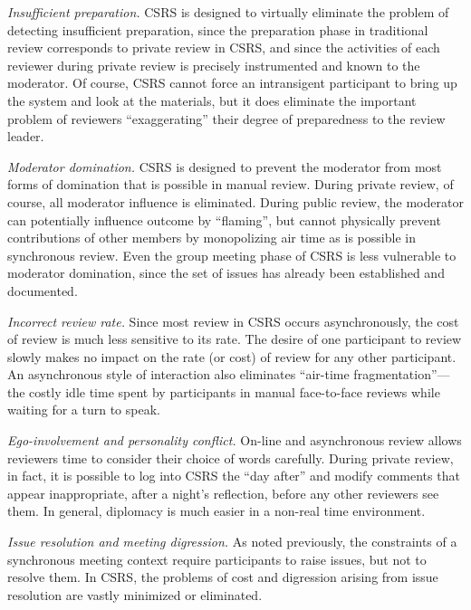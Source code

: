 \begin{itemizenoindent}
  
\item {\em Insufficient preparation.} CSRS is designed to virtually
  eliminate the problem of detecting insufficient preparation, since the
  preparation phase in traditional review corresponds to private review in
  CSRS, and since the activities of each reviewer during private review is
  precisely instrumented and known to the moderator.  Of course, CSRS
  cannot force an intransigent participant to bring up the system and look
  at the materials, but it does eliminate the important problem of
  reviewers ``exaggerating'' their degree of preparedness to the review
  leader.
  
\item {\em Moderator domination.} CSRS is designed to prevent the
  moderator from most forms of domination that is possible in manual review.
  During private review, of course, all moderator influence is eliminated.
  During public review, the moderator can potentially influence outcome by
  ``flaming'', but cannot physically prevent contributions of other members
  by monopolizing air time as is possible in synchronous review.  Even the
  group meeting phase of CSRS is less vulnerable to moderator domination,
  since the set of issues has already been established and documented.
  
\item {\em Incorrect review rate.} Since most review in CSRS occurs
  asynchronously, the cost of review is much less sensitive to its rate.
  The desire of one participant to review slowly makes no impact on the
  rate (or cost) of review for any other participant.  An asynchronous
  style of interaction also eliminates ``air-time fragmentation''---the
  costly idle time spent by participants in manual face-to-face reviews
  while waiting for a turn to speak.
  
\item {\em Ego-involvement and personality conflict.} On-line and
  asynchronous review allows reviewers time to consider their choice of
  words carefully.  During private review, in fact, it is possible to log
  into CSRS the ``day after'' and modify comments that appear
  inappropriate, after a night's reflection, before any other reviewers
  see them.  In general, diplomacy is much easier in a non-real time
  environment.
  
\item {\em Issue resolution and meeting digression.} As noted previously,
  the constraints of a synchronous meeting context require participants to
  raise issues, but not to resolve them.  In CSRS, the problems of cost and
  digression arising from issue resolution are vastly minimized or
  eliminated.  
  

\end{itemizenoindent}
